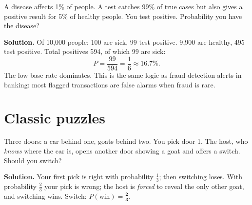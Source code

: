 \documentclass[11pt,a4paper,openany]{report}
\begin{document}
\begin{center}
\end{center}
\begin{example}
A disease affects 1\% of people. A test catches 99\% of true cases but also gives a positive result for 5\% of healthy people. You test positive. Probability you have the disease?

\textbf{Solution.} Of 10{,}000 people: 100 are sick, 99 test positive. 9{,}900 are healthy, 495 test positive. Total positives 594, of which 99 are sick:
\[P=\frac{99}{594}=\frac16\approx\mathbf{16.7\%}.\]
The low base rate dominates. This is the same logic as fraud-detection alerts in banking: most flagged transactions are false alarms when fraud is rare.
\end{example}

\section{Classic puzzles}
\begin{example}
Three doors: a car behind one, goats behind two. You pick door 1. The host, who \emph{knows} where the car is, opens another door showing a goat and offers a switch. Should you switch?

\textbf{Solution.} Your first pick is right with probability $\frac13$; then switching loses. With probability $\frac23$ your pick is wrong; the host is \emph{forced} to reveal the only other goat, and switching wins. Switch: $P(\text{win})=\mathbf{\frac23}$.
\end{example}
\end{document}
